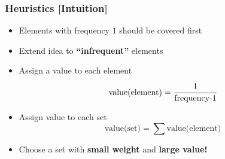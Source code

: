 \documentclass[xcolor=dvipsnames]{beamer}
\begin{document}
\begin{frame}
\frametitle{Heuristics [Intuition]}
\begin{minipage}{0.30\textwidth}
\begin{overlayarea}{\textwidth}{0.5\textheight}
% 
% 
\end{overlayarea}%
\end{minipage}%
\begin{minipage}{0.70\textwidth} 
\begin{itemize}
\item<1-> Elements with frequency $1$ should be covered first
\item<2-> Extend idea to \textbf{``infrequent''} elements
\item<3-> Assign a value to each element
  	$$ \text{value(element)} = \cfrac{1}{\text{frequency-1}}$$
\item<4-> Assign value to each set
	$$ \text{value(set)} = \sum \text{value(element)}$$
\item<5> Choose a set with \textbf{small weight} and \textbf{large value!}
\end{itemize}
\end{minipage}
\end{frame}
\end{document}
